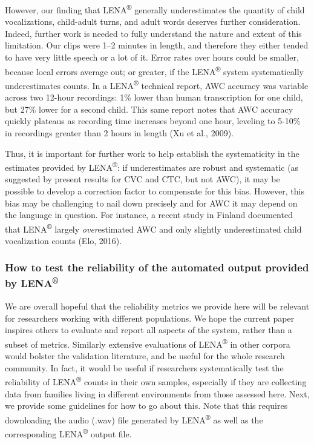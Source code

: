 \documentclass[english,table,man,floatsintext]{apa6}
\begin{document}
However, our finding that LENA\textsuperscript{®} generally underestimates the quantity of child vocalizations, child-adult turns, and adult words deserves further consideration. Indeed, further work is needed to fully understand the nature and extent of this limitation. Our clips were 1--2 minutes in length, and therefore they either tended to have very little speech or a lot of it. Error rates over hours could be smaller, because local errors average out; or greater, if the LENA\textsuperscript{®} system systematically underestimates counts. In a LENA\textsuperscript{®} technical report, AWC accuracy was variable across two 12-hour recordings: 1\% lower than human transcription for one child, but 27\% lower for a second child. This same report notes that AWC accuracy quickly plateaus as recording time increases beyond one hour, leveling to 5-10\% in recordings greater than 2 hours in length (Xu et al., 2009).

Thus, it is important for further work to help establish the systematicity in the estimates provided by LENA\textsuperscript{®}: if underestimates are robust and systematic (as suggested by present results for CVC and CTC, but not AWC), it may be possible to develop a correction factor to compensate for this bias. However, this bias may be challenging to nail down precisely and for AWC it may depend on the language in question. For instance, a recent study in Finland documented that LENA\textsuperscript{®} largely \emph{over}estimated AWC and only slightly underestimated child vocalization counts (Elo, 2016).

\hypertarget{how-to-test-the-reliability-of-the-automated-output-provided-by-lena}{%
\subsubsection{\texorpdfstring{How to test the reliability of the automated output provided by LENA\textsuperscript{®}}{How to test the reliability of the automated output provided by LENA®}}\label{how-to-test-the-reliability-of-the-automated-output-provided-by-lena}}

We are overall hopeful that the reliability metrics we provide here will be relevant for researchers working with different populations. We hope the current paper inspires others to evaluate and report all aspects of the system, rather than a subset of metrics. Similarly extensive evaluations of LENA\textsuperscript{®} in other corpora would bolster the validation literature, and be useful for the whole research community. In fact, it would be useful if researchers systematically test the reliability of LENA\textsuperscript{®} counts in their own samples, especially if they are collecting data from families living in different environments from those assessed here. Next, we provide some guidelines for how to go about this. Note that this requires downloading the audio (.wav) file generated by LENA\textsuperscript{®} as well as the corresponding LENA\textsuperscript{®} output file.
\end{document}
